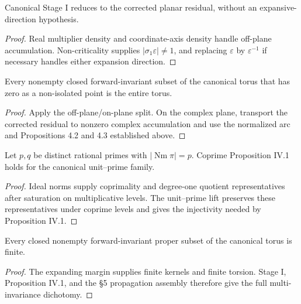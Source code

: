 \begin{lemma}
  \label{lem:stage-one-split}
  \leanok
  Canonical Stage I reduces to the corrected planar residual, without an
  expansive-direction hypothesis.
\end{lemma}
\begin{proof}
  Real multiplier density and coordinate-axis density handle off-plane
  accumulation. Non-criticality supplies \(|\sigma_1\varepsilon|\neq1\), and
  replacing \(\varepsilon\) by \(\varepsilon^{-1}\) if necessary handles either
  expansion direction.
\end{proof}

\begin{theorem}
  \label{thm:canonical-stage-one}
  \leanok
  Every nonempty closed forward-invariant subset of the canonical torus that has
  zero as a non-isolated point is the entire torus.
\end{theorem}
\begin{proof}
  Apply the off-plane/on-plane split. On the complex plane, transport the
  corrected residual to nonzero complex accumulation and use the normalized arc
  and Propositions 4.2 and 4.3 established above.
\end{proof}

\begin{theorem}
  \label{thm:coprime-iv1}
  \leanok
  Let \(p,q\) be distinct rational primes with \(\lvert\operatorname{Nm}\pi\rvert=p\).
  Coprime Proposition IV.1 holds for the canonical unit--prime family.
\end{theorem}
\begin{proof}
  Ideal norms supply coprimality and degree-one quotient representatives after
  saturation on multiplicative levels. The unit--prime lift preserves these
  representatives under coprime levels and gives the injectivity needed by
  Proposition IV.1.
\end{proof}

\begin{theorem}
  \label{thm:canonical-dichotomy}
  \leanok
  Every closed nonempty forward-invariant proper subset of the canonical torus is finite.
\end{theorem}
\begin{proof}
  The expanding margin supplies finite kernels and finite torsion. Stage I,
  Proposition IV.1, and the §5 propagation assembly therefore give the full
  multi-invariance dichotomy.
\end{proof}

